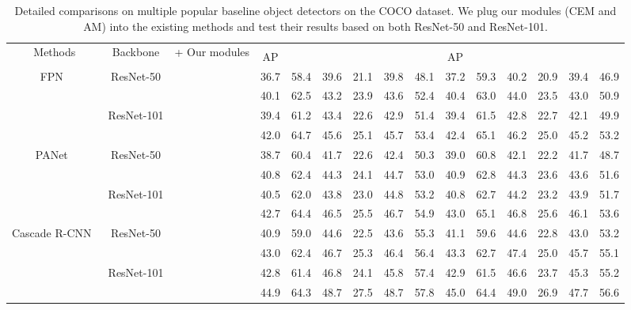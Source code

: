 \documentclass[journal]{IEEEtran}
\def\qcr{\fontfamily{qcr}\selectfont}
\begin{document}
	\begin{table*}[t]
		\centering
		\caption{Detailed comparisons on multiple popular baseline object detectors on the COCO dataset. We plug our modules (CEM and AM) into the existing methods and test their results based on both ResNet-50 and ResNet-101.}
		\resizebox{1.0\linewidth}{!}
		{
			\begin{tabular}{c|c|c|cccccc|cccccc}
				\toprule
				\multirow{2}{*}{Methods} & \multirow{2}{*}{Backbone} & \multicolumn{1}{r|}{\multirow{2}{*}{ + Our modules}} & \multicolumn{6}{c|}{{\qcr{minival}}}                 & \multicolumn{6}{c}{{\qcr{test-dev}}} \\
				\cline{4-15}          &       &       & AP    &  &  &  &  &  & AP   &  &  &  &  &  \\
\hline
				\multirow{4}{*}{ FPN~\cite{lin2017feature}} & \multirow{2}[2]{*}{ResNet-50} &       & 36.7  & 58.4  & 39.6  & 21.1  & 39.8  & 48.1  & 37.2 & 59.3  & 40.2  &  20.9 & 39.4  & 46.9 \\
				&       &      & 40.1 & 62.5 & 43.2 & 23.9 & 43.6 & 52.4 & 40.4 & 63.0 & 44.0 & 23.5 & 43.0 & 50.9\\
				\cline{2-15}          & \multirow{2}[2]{*}{ResNet-101} &       & 39.4 & 61.2 & 43.4 & 22.6 & 42.9  & 51.4 & 39.4 & 61.5  &  42.8  & 22.7 & 42.1 & 49.9  \\
				&       &      & 42.0 & 64.7 & 45.6 & 25.1 & 45.7 & 53.4 & 42.4  & 65.1 & 46.2 & 25.0 & 45.2 & 53.2\\
				\hline
				\multirow{4}{*}{PANet~\cite{liu2018path}} & \multirow{2}[2]{*}{ResNet-50} &       & 38.7 & 60.4 & 41.7 & 22.6 & 42.4 & 50.3 & 39.0 & 60.8 & 42.1 & 22.2 & 41.7 & 48.7 \\
				&       &      & 40.8 & 62.4 & 44.3 & 24.1 & 44.7 & 53.0  & 40.9 & 62.8 & 44.3 & 23.6 & 43.6 &  51.6 \\
				\cline{2-15}          & \multirow{2}[2]{*}{ResNet-101} &       & 40.5 & 62.0 & 43.8 & 23.0 & 44.8 & 53.2 & 40.8 & 62.7 & 44.2 & 23.2 & 43.9 & 51.7\\
				&       &      & 42.7 & 64.4 & 46.5 & 25.5 & 46.7 & 54.9 & 43.0 & 65.1 & 46.8 & 25.6 & 46.1 & 53.6 \\
				\hline
				\multirow{4}{*}{Cascade R-CNN~\cite{cai2018cascade}} & \multirow{2}[2]{*}{ResNet-50} &       & 40.9 & 59.0 & 44.6 & 22.5 & 43.6 & 55.3 & 41.1  & 59.6  &  44.6 & 22.8  & 43.0  & 53.2  \\
				&       &      & 43.0 & 62.4 & 46.7 & 25.3 & 46.4  & 56.4 & 43.3 & 62.7 & 47.4 & 25.0 & 45.7 & 55.1 \\
				\cline{2-15}          & \multirow{2}[2]{*}{ResNet-101} &       & 42.8 & 61.4 & 46.8 & 24.1 & 45.8 & 57.4 & 42.9 & 61.5 & 46.6  & 23.7  & 45.3 &  55.2\\
				&       &      & 44.9 & 64.3 & 48.7 & 27.5 & 48.7 & 57.8 & 45.0 & 64.4 & 49.0 &  26.9 &  47.7 & 56.6 \\
\bottomrule
		\end{tabular}}
\label{tab:object_detection}\end{table*}
\end{document}
